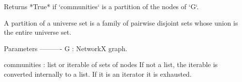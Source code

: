 \begin{DoxyVerb}Returns *True* if `communities` is a partition of the nodes of `G`.

A partition of a universe set is a family of pairwise disjoint sets
whose union is the entire universe set.

Parameters
----------
G : NetworkX graph.

communities : list or iterable of sets of nodes
    If not a list, the iterable is converted internally to a list.
    If it is an iterator it is exhausted.\end{DoxyVerb}
 